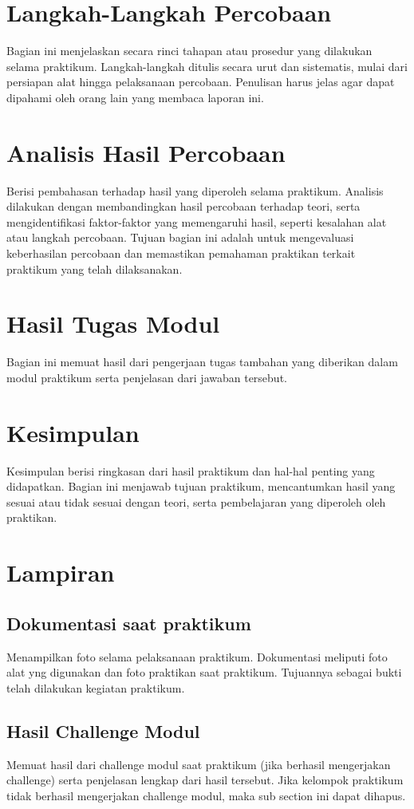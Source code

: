 \section{Langkah-Langkah Percobaan}
Bagian ini menjelaskan secara rinci tahapan atau prosedur yang dilakukan selama praktikum. Langkah-langkah ditulis secara urut dan sistematis, mulai dari persiapan alat hingga pelaksanaan percobaan. Penulisan harus jelas agar dapat dipahami oleh orang lain yang membaca laporan ini.

\section{Analisis Hasil Percobaan}
Berisi pembahasan terhadap hasil yang diperoleh selama praktikum. Analisis dilakukan dengan membandingkan hasil percobaan terhadap teori, serta mengidentifikasi faktor-faktor yang memengaruhi hasil, seperti kesalahan alat atau langkah percobaan. Tujuan bagian ini adalah untuk mengevaluasi keberhasilan percobaan dan memastikan pemahaman praktikan terkait praktikum yang telah dilaksanakan.

\section{Hasil Tugas Modul}
Bagian ini memuat hasil dari pengerjaan tugas tambahan yang diberikan dalam modul praktikum serta penjelasan dari jawaban tersebut. 

\section{Kesimpulan}
Kesimpulan berisi ringkasan dari hasil praktikum dan hal-hal penting yang didapatkan. Bagian ini menjawab tujuan praktikum, mencantumkan hasil yang sesuai atau tidak sesuai dengan teori, serta pembelajaran yang diperoleh oleh praktikan.

\section{Lampiran}
\subsection{Dokumentasi saat praktikum}
Menampilkan foto selama pelaksanaan praktikum. Dokumentasi meliputi foto alat yng digunakan dan foto praktikan saat praktikum. Tujuannya sebagai bukti telah dilakukan kegiatan praktikum.

\subsection{Hasil Challenge Modul}
Memuat hasil dari challenge modul saat praktikum (jika berhasil mengerjakan challenge) serta penjelasan lengkap dari hasil tersebut. Jika kelompok praktikum tidak berhasil mengerjakan challenge modul, maka sub section ini dapat dihapus.
